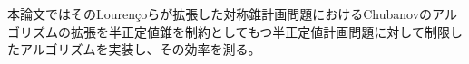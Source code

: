 本論文ではそのLouren\c{c}oらが拡張した対称錐計画問題におけるChubanovのアルゴリズムの拡張を半正定値錐を制約としてもつ半正定値計画問題に対して制限したアルゴリズムを実装し、その効率を測る。

